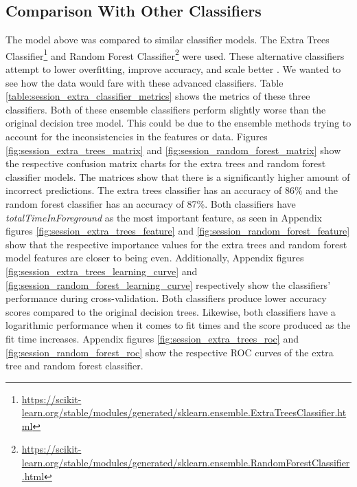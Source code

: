 \documentclass{l4proj}
\begin{document}
\subsection{Comparison With Other Classifiers}
The model above was compared to similar classifier models. The  Extra Trees Classifier\footnote{\url{https://scikit-learn.org/stable/modules/generated/sklearn.ensemble.ExtraTreesClassifier.html}} and Random Forest Classifier\footnote{\url{https://scikit-learn.org/stable/modules/generated/sklearn.ensemble.RandomForestClassifier.html}} were used. These alternative classifiers attempt to lower overfitting, improve accuracy, and scale better \citep{extra_trees_1, extra_trees_2, random_forests}. We wanted to see how the data would fare with these advanced classifiers. Table \ref{table:session_extra_classifier_metrics} shows the metrics of these three classifiers. Both of these ensemble classifiers perform slightly worse than the original decision tree model. This could be due to the ensemble methods trying to account for the inconsistencies in the features or data. Figures \ref{fig:session_extra_trees_matrix} and \ref{fig:session_random_forest_matrix} show the respective confusion matrix charts for the extra trees and random forest classifier models. The matrices show that there is a significantly higher amount of incorrect predictions. The extra trees classifier has an accuracy of \num{86}\% and the random forest classifier has an accuracy of \num{87}\%. Both classifiers have \textit{totalTimeInForeground} as the most important feature, as seen in Appendix figures \ref{fig:session_extra_trees_feature} and \ref{fig:session_random_forest_feature} show that the respective importance values for the extra trees and random forest model features are closer to being even. Additionally, Appendix figures \ref{fig:session_extra_trees_learning_curve} and \ref{fig:session_random_forest_learning_curve} respectively show the classifiers' performance during cross-validation. Both classifiers produce lower accuracy scores compared to the original decision trees. Likewise, both classifiers have a logarithmic performance when it comes to fit times and the score produced as the fit time increases. Appendix figures \ref{fig:session_extra_trees_roc} and \ref{fig:session_random_forest_roc} show the respective ROC curves of the extra tree and random forest classifier.
\end{document}
